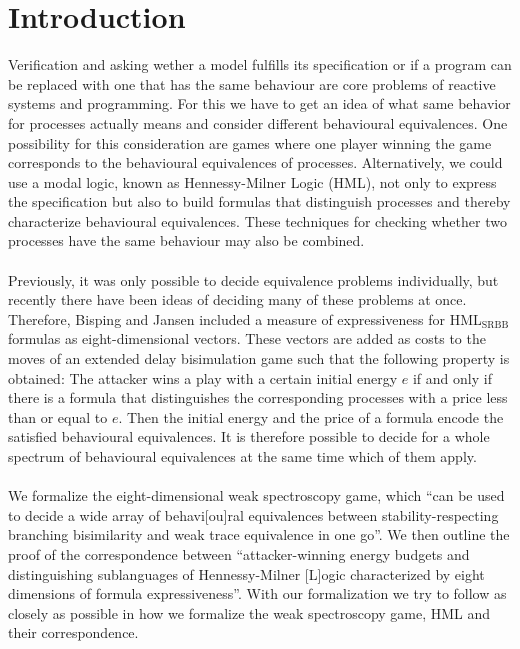 \newpage
\section{Introduction} 
Verification and asking wether a model fulfills its specification or if a program can be replaced with one that has the same behaviour are core problems of reactive systems and programming.
For this we have to get an idea of what same behavior for processes actually means and consider different behavioural equivalences.
One possibility for this consideration are games where one player winning the game corresponds to the behavioural equivalences of processes.
Alternatively, we could use a modal logic, known as Hennessy-Milner Logic (HML), not only to express the specification but also to build formulas that distinguish processes and 
thereby characterize behavioural equivalences.
These techniques for checking whether two processes have the same behaviour may also be combined.
\\\\
Previously, it was only possible to decide equivalence problems individually, but recently there have been ideas of deciding many of these problems at once.
Therefore, Bisping and Jansen \cite{bisping2023lineartimebranchingtime} included a measure of expressiveness for HML$_\text{{SRBB}}$ formulas as eight-dimensional vectors.
These vectors are added as costs to the moves of an extended delay bisimulation game such that the following property is obtained: 
The attacker wins a play with a certain initial energy $e$ if and only if there is a formula that distinguishes the corresponding processes with a price less than or equal to $e$.
Then the initial energy and the price of a formula encode the satisfied behavioural equivalences.
It is therefore possible to decide for a whole spectrum of behavioural equivalences at the same time which of them apply.
\\\\
We formalize the eight-dimensional weak spectroscopy game, 
which ``can be used to decide a wide array of behavi[ou]ral equivalences between stability-respecting branching bisimilarity and weak trace equivalence in one go''\cite[Abstract]{bisping2023lineartimebranchingtime}.
We then outline the proof of the correspondence between ``attacker-winning energy budgets and distinguishing sublanguages of Hennessy-Milner [L]ogic characterized by eight dimensions of formula expressiveness''\cite[Abstract]{bisping2023lineartimebranchingtime}.
With our formalization we try to follow \cite{bisping2023lineartimebranchingtime} as closely as possible in how we formalize the weak spectroscopy game, HML and their correspondence.
